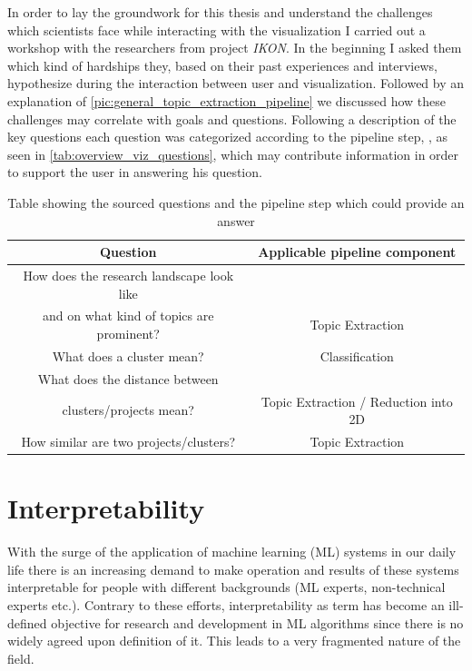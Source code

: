 In order to lay the groundwork for this thesis and understand the challenges which scientists face while interacting with the visualization I carried out a workshop with the researchers from project \textit{IKON}. In the beginning I asked them which kind of hardships they, based on their past experiences and interviews, hypothesize during the interaction between user and visualization. Followed by an explanation of \autoref{pic:general_topic_extraction_pipeline} we discussed how these challenges may correlate with goals and questions. Following a description of the key questions each question was categorized according to the pipeline step, , as seen in \autoref{tab:overview_viz_questions}, which may contribute information in order to support the user in answering his question.

\begin{table}
	\centering
	\begin{tabular}{ c | c }
		\hline 
		Question & Applicable pipeline component \\ \hline
		How does the research landscape look like \\ and on what kind of topics are prominent? & Topic Extraction \\ \hline
		What does a cluster mean? & Classification \\ \hline
		What does the distance between \\ clusters/projects mean? & Topic Extraction / Reduction into 2D \\ \hline
		How similar are two projects/clusters? & Topic Extraction \\
		\hline
	\end{tabular}
	\caption{\label{tab:overview_viz_questions} Table showing the sourced questions and the pipeline step which could provide an answer}
\end{table} 

\section{Interpretability}

With the surge of the application of machine learning (ML) systems in our daily life there is an increasing demand to make operation and results of these systems interpretable for people with different backgrounds (ML experts, non-technical experts etc.). Contrary to these efforts, interpretability as term has become an ill-defined objective \cite{liptonMythosModelInterpretability2016a} for research and development in ML algorithms since there is no widely agreed upon definition of it. This leads to a very fragmented nature of the field. 

